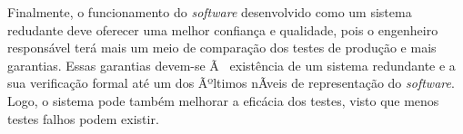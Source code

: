 \documentclass[11pt]{article} %
\begin{document}
Finalmente, o funcionamento do \textit{software} desenvolvido como um sistema redudante deve oferecer uma melhor confiança e qualidade,
pois o engenheiro responsável terá mais um meio de comparação dos testes de produção e mais garantias. Essas garantias
devem-se Ã  existência de um sistema redundante e a sua verificação formal até um dos Ãºltimos nÃ­veis de representação
do \textit{software}. Logo, o sistema pode também melhorar a eficácia dos testes, visto que menos testes falhos podem existir.






 
% 
% 
% 
% 
% 
\end{document}
